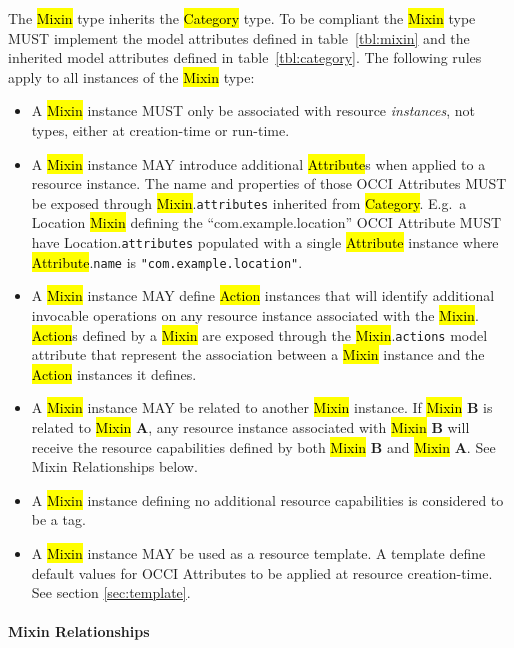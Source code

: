 \documentclass[10pt,a4paper]{article}
\begin{document}
The \hl{Mixin} type inherits the \hl{Category} type. To be compliant
the \hl{Mixin} type MUST implement the model attributes defined in
table~\ref{tbl:mixin} and the inherited model attributes defined in
table~\ref{tbl:category}. The following rules apply to all instances
of the \hl{Mixin} type:
%
\begin{itemize}
  \item A \hl{Mixin} instance MUST only be associated with resource
    {\em instances}, not types, either at creation-time or run-time.

  \item A \hl{Mixin} instance MAY introduce additional \hl{Attribute}s
    when applied to a resource instance. The name and properties of those
    OCCI Attributes MUST be exposed through \hl{Mixin}.{\tt attributes}
    inherited from \hl{Category}.  E.g.~a Location
    \hl{Mixin} defining the ``com.example.location'' OCCI Attribute MUST
    have Location.{\tt attributes} populated with a single \hl{Attribute}
    instance where \hl{Attribute}.{\tt name} is {\tt "com.example.location"}.

  \item A \hl{Mixin} instance MAY define \hl{Action} instances that will
    identify additional invocable operations on any resource instance
    associated with the
    \hl{Mixin}.  \hl{Action}s defined by a \hl{Mixin} are exposed
    through the \hl{Mixin}.{\tt actions} model attribute that represent the
    association between a \hl{Mixin} instance and the \hl{Action} instances it
    defines.
  \item A \hl{Mixin} instance MAY be related to another \hl{Mixin}
    instance.  If \hl{Mixin} {\bf B} is related to \hl{Mixin} {\bf A},
    any resource instance associated with \hl{Mixin} {\bf B} will
    receive the resource capabilities defined by both \hl{Mixin} {\bf
      B} and \hl{Mixin} {\bf A}.  See Mixin Relationships below.
  \item A \hl{Mixin} instance defining no additional resource
    capabilities is considered to be a tag.

  \item A \hl{Mixin} instance MAY be used as a resource template. A template
    define default values for OCCI Attributes to be applied at resource
    creation-time. See section \ref{sec:template}.

\end{itemize}

\paragraph*{Mixin Relationships}
\end{document}
